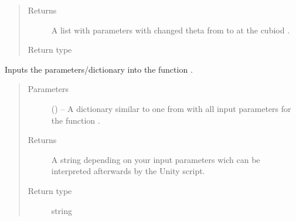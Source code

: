 \documentclass[letterpaper,10pt,english]{sphinxmanual}
\begin{document}
\begin{fulllineitems}
\begin{fulllineitems}
\begin{quote}
\begin{description}
\begin{itemize}
\end{itemize}

\item[{Returns}] \leavevmode
A list with  parameters with changed theta from  to  at the cubiod .

\item[{Return type}] \leavevmode
{}

\end{description}\end{quote}

\end{fulllineitems}


\begin{fulllineitems}
\label{\detokenize{index:dataset.dataset_cuboids.create_json_string_from_parameters}}
Inputs the parameters/dictionary into the function {\hyperref[\detokenize{index:client.client_communicator_to_unity.write_json_crane}]{}}.
\begin{quote}\begin{description}
\item[{Parameters}] \leavevmode
{} () -- A dictionary similar to one from {\hyperref[\detokenize{index:dataset.dataset_cuboids.create_random_parameters}]{}} with all input parameters for the function {\hyperref[\detokenize{index:client.client_communicator_to_unity.write_json_crane}]{}}.

\item[{Returns}] \leavevmode
A string depending on your input parameters wich can be interpreted afterwards by the Unity script.

\item[{Return type}] \leavevmode
string

\end{description}\end{quote}


\end{fulllineitems}
\end{fulllineitems}
\end{document}

